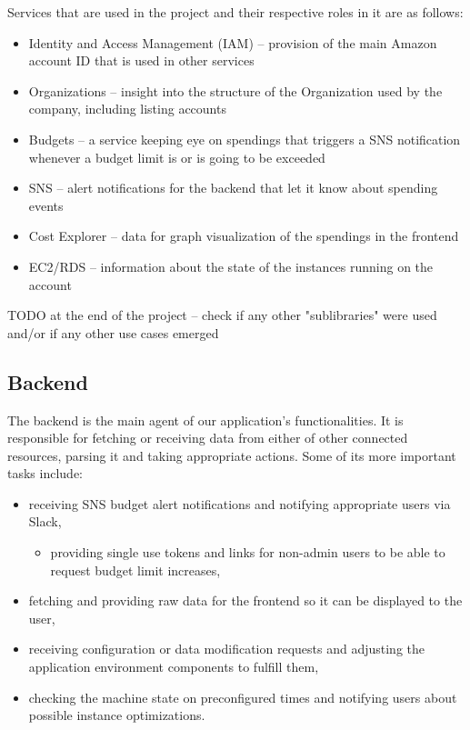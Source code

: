 \documentclass[licencjacka,en]{thesisclass}
\begin{document}
    Services that are used in the project and their respective roles in it are as follows:
    \begin{itemize}
        \item Identity and Access Management (IAM) -- provision of the main
          Amazon account ID that is used in other services
        \item Organizations -- insight into the structure of the Organization
          used by the company, including listing accounts
        \item Budgets -- a service keeping eye on spendings that triggers
          a SNS notification whenever a budget limit is or is going to be exceeded
        \item SNS -- alert notifications for the backend that let it know about spending events
        \item Cost Explorer -- data for graph visualization of the spendings in the frontend
        \item EC2/RDS -- information about the state of the instances running on the account
    \end{itemize}

    TODO at the end of the project -- check if any other
    "sublibraries" were used and/or if any other use cases emerged

    \subsection{Backend}

    The backend is the main agent of our application's functionalities.
    It is responsible for fetching or receiving data from either
    of other connected resources, parsing it and taking appropriate actions.
    Some of its more important tasks include:
    \begin{itemize}
        \item receiving SNS budget alert notifications
          and notifying appropriate users via Slack,
        \begin{itemize}
            \item providing single use tokens and links
              for non-admin users to be able to request budget limit increases,
        \end{itemize}
        \item fetching and providing raw data for the frontend
          so it can be displayed to the user,
        \item receiving configuration or data modification requests
          and adjusting the application environment components to fulfill them,
        \item checking the machine state on preconfigured times
          and notifying users about possible instance optimizations.
    \end{itemize}
\end{document}
